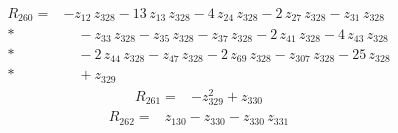 \documentclass[10pt]{article}
\begin{document}
\begin{align*}
R_{260}={}& - z_{12}\,z_{328} - 13\,z_{13}\,z_{328} - 4\,z_{24}\,z_{328} - 2\,z_{27}\,z_{328} - z_{31}\,z_{328} \\*
&\quad - z_{33}\,z_{328} - z_{35}\,z_{328} - z_{37}\,z_{328} - 2\,z_{41}\,z_{328} - 4\,z_{43}\,z_{328} \\*
&\quad - 2\,z_{44}\,z_{328} - z_{47}\,z_{328} - 2\,z_{69}\,z_{328} - z_{307}\,z_{328} - 25\,z_{328} \\*
&\quad + z_{329}
\end{align*}
\begin{align*}
R_{261}={}& - z_{329}^{2} + z_{330}
\end{align*}
\begin{align*}
R_{262}={}& z_{130} - z_{330} - z_{330}\,z_{331}
\end{align*}
\end{document}
